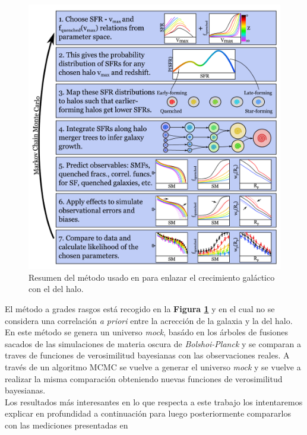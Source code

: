 \begin{figure}
	\centering
	\includegraphics[scale=0.5]{Figures/behroozi_mcmc}
	\caption{\label{fig:behroozi_mcmc} Resumen del método usado en \cite{behroozi2019universemachine} para enlazar el crecimiento galáctico con el del halo.}
\end{figure}

El método a grades rasgos está recogido en la \textbf{Figura \ref{fig:behroozi_mcmc}} y en  el cual no se considera una correlación \textit{a priori} entre la acrección de la galaxia y la del halo. En este método se genera un universo \textit{mock}, basádo en los árboles de fusiones sacados de las simulaciones de materia oscura de \textit{Bolshoi-Planck} y se comparan a traves de funciones de verosimilitud bayesianas con las observaciones reales. A través de un algoritmo MCMC se vuelve a generar el universo \textit{mock} y se vuelve a realizar la misma comparación obteniendo nuevas funciones de verosimilitud bayesianas. \\

Los resultados más interesantes en lo que respecta a este trabajo los intentaremos explicar en profundidad a continuación para luego posteriormente compararlos con las mediciones presentadas en \cite{steinhardt2016impossibly}

